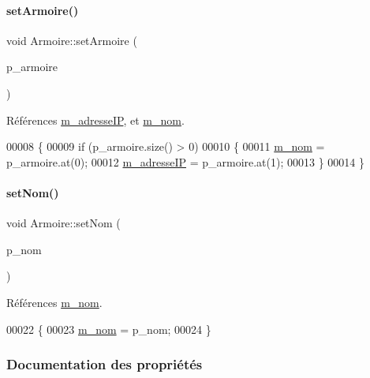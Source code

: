 \paragraph{\texorpdfstring{set\+Armoire()}{setArmoire()}}
{\footnotesize\ttfamily void Armoire\+::set\+Armoire (\begin{DoxyParamCaption}\item[{Q\+String\+List}]{p\+\_\+armoire }\end{DoxyParamCaption})}



Références \hyperlink{class_armoire_ae92e8c48f53e69b871e7f70d9af19ffa}{m\+\_\+adresse\+IP}, et \hyperlink{class_armoire_a6d5fc6a37737b4822dc89191a79f6b7b}{m\+\_\+nom}.


\begin{DoxyCode}
00008 \{
00009     \textcolor{keywordflow}{if} (p\_armoire.size() > 0)
00010     \{
00011         \hyperlink{class_armoire_a6d5fc6a37737b4822dc89191a79f6b7b}{m\_nom} = p\_armoire.at(0);
00012         \hyperlink{class_armoire_ae92e8c48f53e69b871e7f70d9af19ffa}{m\_adresseIP} = p\_armoire.at(1);
00013     \}
00014 \}
\end{DoxyCode}
\mbox{\label{class_armoire_ab05030741c5930bb73a8fef5b378ed37}} 
\paragraph{\texorpdfstring{set\+Nom()}{setNom()}}
{\footnotesize\ttfamily void Armoire\+::set\+Nom (\begin{DoxyParamCaption}\item[{Q\+String}]{p\+\_\+nom }\end{DoxyParamCaption})}



Références \hyperlink{class_armoire_a6d5fc6a37737b4822dc89191a79f6b7b}{m\+\_\+nom}.


\begin{DoxyCode}
00022 \{
00023     \hyperlink{class_armoire_a6d5fc6a37737b4822dc89191a79f6b7b}{m\_nom} = p\_nom;
00024 \}
\end{DoxyCode}


\subsubsection{Documentation des propriétés}
\mbox{\label{class_armoire_ae92e8c48f53e69b871e7f70d9af19ffa}} 
